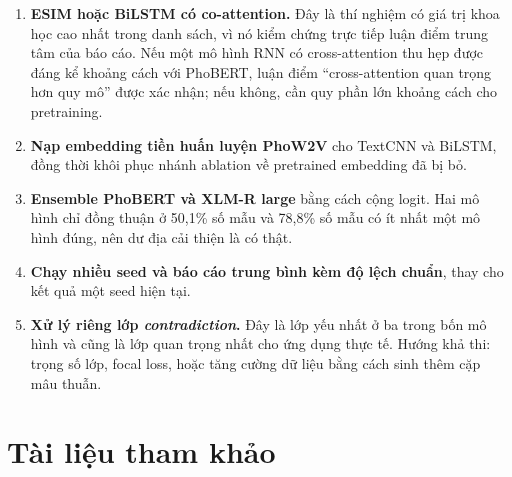\documentclass[12pt,a4paper,oneside]{report}
\begin{document}
\begin{enumerate}[leftmargin=*,itemsep=4pt]
  \item \textbf{ESIM hoặc BiLSTM có co-attention.} Đây là thí nghiệm có giá trị khoa học
        cao nhất trong danh sách, vì nó kiểm chứng trực tiếp luận điểm trung tâm của báo
        cáo. Nếu một mô hình RNN có cross-attention thu hẹp được đáng kể khoảng cách với
        PhoBERT, luận điểm ``cross-attention quan trọng hơn quy mô'' được xác nhận; nếu
        không, cần quy phần lớn khoảng cách cho pretraining.
  \item \textbf{Nạp embedding tiền huấn luyện PhoW2V} cho TextCNN và BiLSTM, đồng thời
        khôi phục nhánh ablation về pretrained embedding đã bị bỏ.
  \item \textbf{Ensemble PhoBERT và XLM-R large} bằng cách cộng logit. Hai mô hình chỉ
        đồng thuận ở 50,1\% số mẫu và 78,8\% số mẫu có ít nhất một mô hình đúng, nên dư
        địa cải thiện là có thật.
  \item \textbf{Chạy nhiều seed và báo cáo trung bình kèm độ lệch chuẩn}, thay cho kết quả
        một seed hiện tại.
  \item \textbf{Xử lý riêng lớp \textit{contradiction}.} Đây là lớp yếu nhất ở ba trong
        bốn mô hình và cũng là lớp quan trọng nhất cho ứng dụng thực tế. Hướng khả thi:
        trọng số lớp, focal loss, hoặc tăng cường dữ liệu bằng cách sinh thêm cặp mâu
        thuẫn.
\end{enumerate}

\chapter*{Tài liệu tham khảo}
\end{document}
